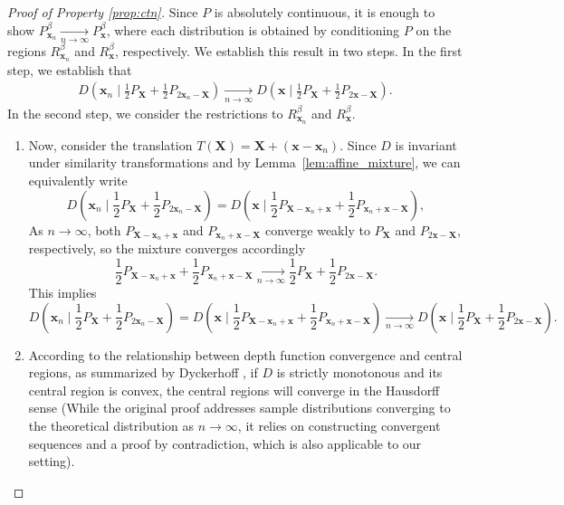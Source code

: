 \documentclass[final,3p,times]{elsarticle}
\newcommand{\vecx}{\mathbf{x}}
\newcommand{\vecX}{\mathbf{X}}
\begin{document}
\begin{proof}[Proof of Property \ref{prop:ctn}]
Since $P$ is absolutely continuous, it is enough to show $P^\beta_{\vecx_n}\xrightarrow[n \to \infty]{} P^\beta_\vecx$, where each distribution is obtained by conditioning $P$ on the regions $R^\beta_{\vecx_n}$ and $R^\beta_{\vecx}$, respectively. We establish this result in two steps. In the first step, we establish that
\begin{eqnarray}
    D(\vecx_n \mid \frac{1}{2}P_{\vecX} + \frac{1}{2}P_{2\vecx_n - \vecX}) \xrightarrow[n \to \infty]{} D(\vecx \mid \frac{1}{2}P_{\vecX} + \frac{1}{2}P_{2\vecx - \vecX}).
\end{eqnarray}
In the second step, we consider the restrictions to $R^\beta_{\vecx_n}$ and $R^\beta_{\vecx}$.\\
\begin{enumerate}[Step 1]
    \item Now, consider the translation $T(\vecX) = \vecX + (\vecx - \vecx_n)$. Since $D$ is invariant under similarity transformations and by Lemma~\ref{lem:affine_mixture}, we can equivalently write
\[
D(\vecx_n \mid \frac{1}{2}P_{\vecX} + \frac{1}{2}P_{2\vecx_n - \vecX}) = D(\vecx \mid \frac{1}{2}P_{\vecX - \vecx_n + \vecx} + \frac{1}{2}P_{\vecx_n + \vecx - \vecX}),
\]
As $n \to \infty$, both $P_{\vecX - \vecx_n + \vecx}$ and $P_{\vecx_n + \vecx - \vecX}$ converge weakly to $P_{\vecX}$ and $P_{2\vecx - \vecX}$, respectively, so the mixture converges accordingly
\[
\frac{1}{2}P_{\vecX - \vecx_n + \vecx} + \frac{1}{2}P_{\vecx_n + \vecx - \vecX} \xrightarrow[n \to \infty]{} \frac{1}{2}P_{\vecX} + \frac{1}{2}P_{2\vecx - \vecX}.
\]
This implies
\[
D(\vecx_n \mid \frac{1}{2}P_{\vecX} + \frac{1}{2}P_{2\vecx_n - \vecX}) = D\left(\vecx \mid \frac{1}{2}P_{\vecX - \vecx_n + \vecx} + \frac{1}{2}P_{\vecx_n + \vecx - \vecX}\right) \xrightarrow[n \to \infty]{} D(\vecx \mid \frac{1}{2}P_{\vecX} + \frac{1}{2}P_{2\vecx - \vecX}).
\]
\item According to the relationship between depth function convergence and central regions, as summarized by Dyckerhoff \cite{dyckerhoff2016convergence}, if $D$ is strictly monotonous and its central region is convex, the central regions will converge in the Hausdorff sense (While the original proof addresses sample distributions converging to the theoretical distribution as $n \to \infty$, it relies on constructing convergent sequences and a proof by contradiction, which is also applicable to our setting).


\end{enumerate}
\end{proof}
\end{document}
